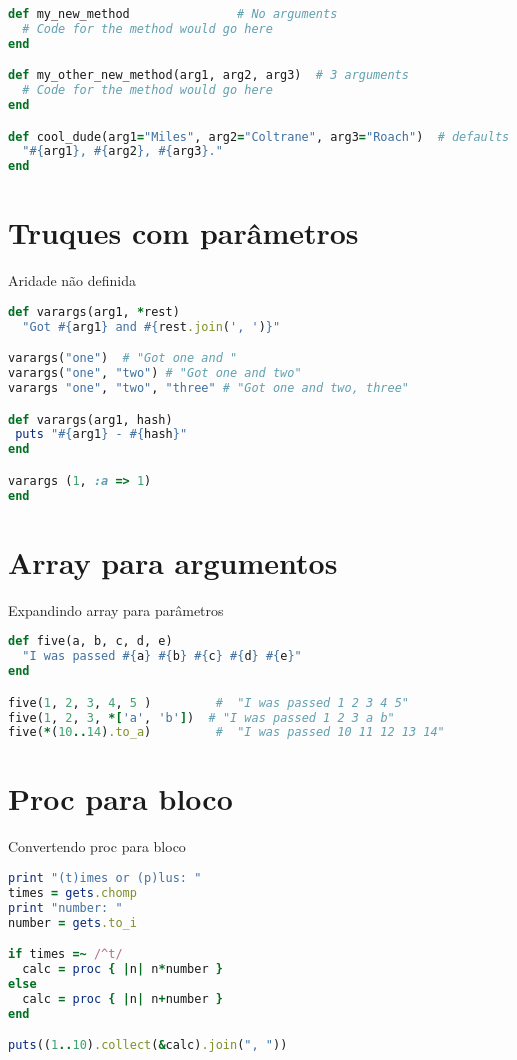 \documentclass[serif,mathserif]{book}
\begin{document}
\begin{lstlisting}[language=ruby]
def my_new_method               # No arguments
  # Code for the method would go here
end

def my_other_new_method(arg1, arg2, arg3)  # 3 arguments
  # Code for the method would go here
end

def cool_dude(arg1="Miles", arg2="Coltrane", arg3="Roach")  # defaults
  "#{arg1}, #{arg2}, #{arg3}."
end
\end{lstlisting}

\section{Truques com parâmetros}

Aridade não definida

\begin{lstlisting}[language=ruby]
def varargs(arg1, *rest)
  "Got #{arg1} and #{rest.join(', ')}"

varargs("one")  # "Got one and "
varargs("one", "two") # "Got one and two"
varargs "one", "two", "three" # "Got one and two, three"

def varargs(arg1, hash)
 puts "#{arg1} - #{hash}"
end

varargs (1, :a => 1)
end
\end{lstlisting}

\section{Array para argumentos}

Expandindo array para parâmetros

\begin{lstlisting}[language=ruby]
def five(a, b, c, d, e)
  "I was passed #{a} #{b} #{c} #{d} #{e}"
end

five(1, 2, 3, 4, 5 )         #  "I was passed 1 2 3 4 5"
five(1, 2, 3, *['a', 'b'])  # "I was passed 1 2 3 a b"
five(*(10..14).to_a)         #  "I was passed 10 11 12 13 14"
\end{lstlisting}

\section{Proc para bloco}

Convertendo proc para bloco

\begin{lstlisting}[language=ruby]
print "(t)imes or (p)lus: "
times = gets.chomp
print "number: "
number = gets.to_i

if times =~ /^t/
  calc = proc { |n| n*number }
else
  calc = proc { |n| n+number }
end

puts((1..10).collect(&calc).join(", "))
\end{lstlisting}
\end{document}
